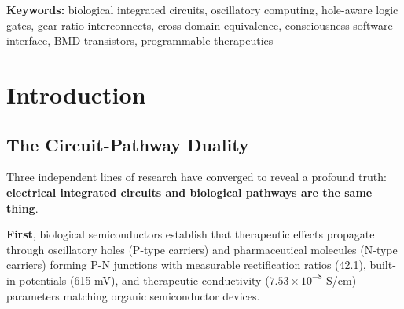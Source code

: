 \documentclass[11pt,a4paper]{article}
\begin{document}
\begin{abstract}
Theoretical analysis establishes the Circuit-Pathway Duality Theorem: electrical integrated circuits and biological pathway networks represent identical computational substrates in unified S-entropy space, enabling direct compilation of software programs into therapeutic interventions, hardware circuit designs into metabolic engineering targets, and consciousness intentions into biochemical outcomes. Integration with ENAQT (24\% noise enhancement) provides self-healing, hole-aware transformers (18.7\% performance gain) enable functional-absence computation, and trans-Planckian timing ($7.51\times10^{-50}$ s precision) achieves quantum-classical bridging. The framework establishes biological systems not as analog approximations of digital circuits but as native oscillatory computers with fundamentally superior architectures: O(1) complexity, cross-domain programmability, consciousness interfacing, self-repair, and multi-scale parallelism. Applications span programmable therapeutics, synthetic biology circuit design, consciousness-controlled implants, biological cryptography, and living computational substrates for artificial general intelligence.
\end{abstract}

\noindent\textbf{Keywords:} biological integrated circuits, oscillatory computing, hole-aware logic gates, gear ratio interconnects, cross-domain equivalence, consciousness-software interface, BMD transistors, programmable therapeutics

\section{Introduction}

\subsection{The Circuit-Pathway Duality}

Three independent lines of research have converged to reveal a profound truth: \textbf{electrical integrated circuits and biological pathways are the same thing}.

\textbf{First}, biological semiconductors establish that therapeutic effects propagate through oscillatory holes (P-type carriers) and pharmaceutical molecules (N-type carriers) forming P-N junctions with measurable rectification ratios (42.1), built-in potentials (615 mV), and therapeutic conductivity ($7.53\times10^{-8}$ S/cm)—parameters matching organic semiconductor devices\cite{biological_semiconductors}.
\end{document}
